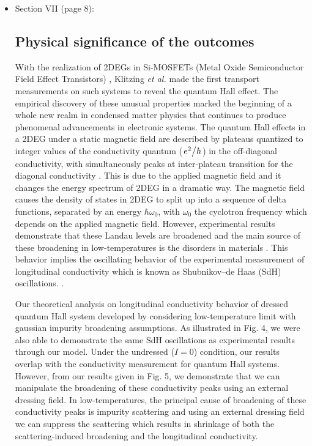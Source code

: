 \documentclass{article}
\begin{document}
\begin{itemize}
  \item Section VII (page 8):\\
  {\color{Maroon}
  \subsection*{Physical significance of the outcomes}

  With the realization of 2DEGs in Si-MOSFETs (Metal Oxide Semiconductor Field Effect Transistors) \cite{fowler66}, Klitzing \textit{et al.} \cite{klitzing80} made the first transport measurements on such systems to reveal the quantum Hall effect. The empirical discovery of these unusual properties marked the beginning of a whole new realm in condensed matter physics that continues to produce phenomenal advancements in electronic systems. The quantum Hall effects in a 2DEG under a static magnetic field are described by plateaus quantized to integer values of the conductivity quantum ($\flatfrac{e^2}{\hbar}$) in the off-diagonal conductivity, with simultaneously peaks at inter-plateau transition for the diagonal conductivity \cite{endo09}. This is due to the applied magnetic field and it changes the energy spectrum of 2DEG in a dramatic way. The magnetic field causes the density of states in 2DEG to split up into a sequence of delta functions, separated by an energy $\hbar\omega_0$, with $\omega_0$ the cyclotron frequency which depends on the applied magnetic field.
  However, experimental results demonstrate that these Landau levels are broadened and the main source of these broadening in low-temperatures is the disorders in materials \cite{ando85,dial07}. This behavior implies the oscillating behavior of the experimental measurement of longitudinal conductivity which is known as Shubnikov–de Haas (SdH) oscillations. \cite{endo09,wakabayashi78}.

  Our theoretical analysis on longitudinal conductivity behavior of dressed quantum Hall system developed by considering low-temperature limit with gaussian impurity broadening assumptions. As illustrated in Fig. 4, we were also able to demonstrate the same SdH oscillations as experimental results \cite{endo09,wakabayashi78} through our model. Under the undressed ($I=0$) condition, our results overlap with the conductivity measurement for quantum Hall systems. However, from our results given in Fig. 5, we demonstrate that we can manipulate the broadening of these conductivity peaks using an external dressing field. In low-temperatures, the principal cause of broadening of these conductivity peaks is impurity scattering and using an external dressing field we can suppress the scattering which results in shrinkage of both the scattering-induced broadening and the longitudinal conductivity.

}
\end{itemize}
\end{document}
